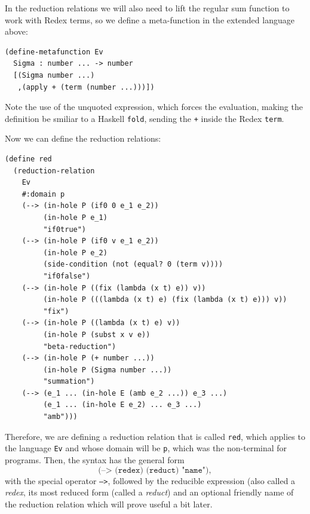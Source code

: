 In the reduction relations we will also need to lift the regular sum function
to work with Redex terms, so we define a meta-function in the extended
language above:
{
  \small
\begin{verbatim}
(define-metafunction Ev
  Sigma : number ... -> number
  [(Sigma number ...)
   ,(apply + (term (number ...)))])
\end{verbatim}
}
Note the use of the unquoted expression, which forces the evaluation, making
the definition be smiliar to a Haskell \texttt{fold}, sending the \texttt{+}
inside the Redex \texttt{term}.

Now we can define the reduction relations\footnotemark:

  
\newpage
{
  \small
\begin{verbatim}
(define red
  (reduction-relation
    Ev
    #:domain p
    (--> (in-hole P (if0 0 e_1 e_2))
         (in-hole P e_1)
         "if0true")
    (--> (in-hole P (if0 v e_1 e_2))
         (in-hole P e_2)
         (side-condition (not (equal? 0 (term v))))
         "if0false")
    (--> (in-hole P ((fix (lambda (x t) e)) v))
         (in-hole P (((lambda (x t) e) (fix (lambda (x t) e))) v))
         "fix")
    (--> (in-hole P ((lambda (x t) e) v))
         (in-hole P (subst x v e))
         "beta-reduction")
    (--> (in-hole P (+ number ...))
         (in-hole P (Sigma number ...))
         "summation")
    (--> (e_1 ... (in-hole E (amb e_2 ...)) e_3 ...)
         (e_1 ... (in-hole E e_2) ... e_3 ...)
         "amb")))
\end{verbatim}
}

\newpage

Therefore, we are defining a reduction relation that is called \texttt{red},
which applies to the language \texttt{Ev} and whose domain will be \texttt{p},
which was the non-terminal for programs. Then, the syntax has the general form
\[
  \texttt{(--> (redex) (reduct) "name")},
\]
with the special operator \texttt{-->}, followed by the reducible expression
(also called a \emph{redex}, its most reduced form (called a \emph{reduct})
and an optional friendly name of the reduction relation which will prove
useful a bit later.

